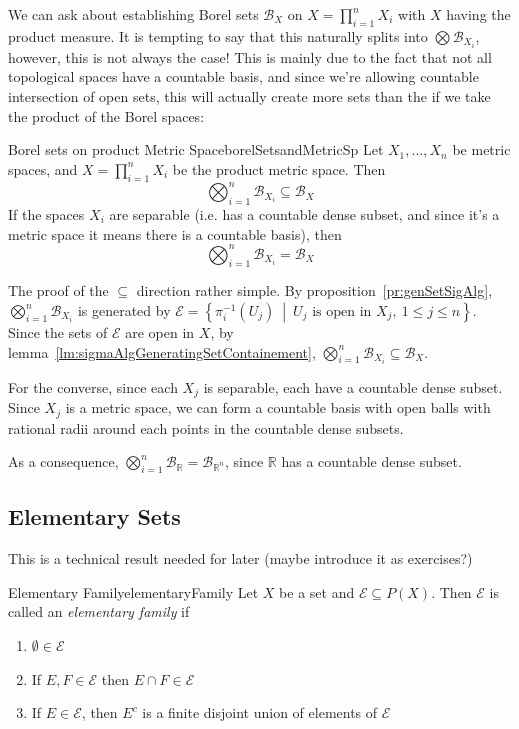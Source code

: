 \documentclass[oneside]{book}
\newcommand{\R}{\mathbb{R}}
\newcommand{\CE}{\mathcal{E}}
\newcommand{\BB}{\mathcal{B}}
\newcommand{\sse}{\subseteq}
\newcommand{\set}[2]{\left\{#1 \ \middle|\ #2\right\}}
\begin{document}
We can ask about establishing Borel sets $\BB_X$ on $X = \prod_{i=1}^n X_i$ with $X$ having the product measure. It is
tempting to say that this naturally splits into $\bigotimes \BB_{X_i}$, however, this is not always the case! This is
mainly due to the fact that not all topological spaces have a countable basis, and since we're allowing countable
intersection of open sets, this will actually create more sets than the if we take the product of the Borel spaces:
\begin{prop}{Borel sets on product Metric Space}{borelSetsandMetricSp}
	Let $X_1, ..., X_n$ be metric spaces, and $X = \prod_{i=1}^n X_i$ be the product metric space. Then
	\[
		\bigotimes_{i=1}^n \BB_{X_i} \sse \BB_X
	\]
	If the spaces $X_i$ are separable (i.e. has a countable dense subset, and since it's a metric space it means there
	is a countable basis), then
	\[
		\bigotimes_{i=1}^n \BB_{X_i} = \BB_X
	\]
\end{prop}

\begin{Proof}
	The proof of the $\sse$ direction rather simple. By proposition~\ref{pr:genSetSigAlg}, $\bigotimes_{i=1}^n
	\BB_{X_i}$ is generated by $\CE = \set{\pi_i^{-1}(U_j)}{U_j\text{ is open in $X_j$},\ 1 \le j \le n}$. Since the
	sets of $\CE$ are open in $X$, by lemma~\ref{lm:sigmaAlgGeneratingSetContainement}, $\bigotimes_{i=1}^n \BB_{X_i}
	\sse \BB_X$. 

	For the converse, since each $X_j$ is separable, each have a countable dense subset. Since $X_j$ is a metric space,
	we can form a countable basis with open balls with rational radii around each points in the countable dense subsets. 
\end{Proof}

As a consequence, $\bigotimes_{i=1}^n \BB_{\R} = \BB_{\R^n}$, since $\R$ has a countable dense subset. 

\subsection*{Elementary Sets}

This is a technical result needed for later (maybe introduce it as exercises?)

\begin{defn}{Elementary Family}{elementaryFamily}
	Let $X$ be a set and $\CE \sse P(X)$. Then $\CE$ is called an \emph{elementary family} if 
	\begin{enumerate}
		\item $\emptyset \in \CE$
		\item If $E,F \in \CE$ then $E\cap F \in \CE$
		\item If $E \in \CE$, then $E^c$ is a finite disjoint union of elements of $\CE$
	\end{enumerate}
\end{defn}
\end{document}
